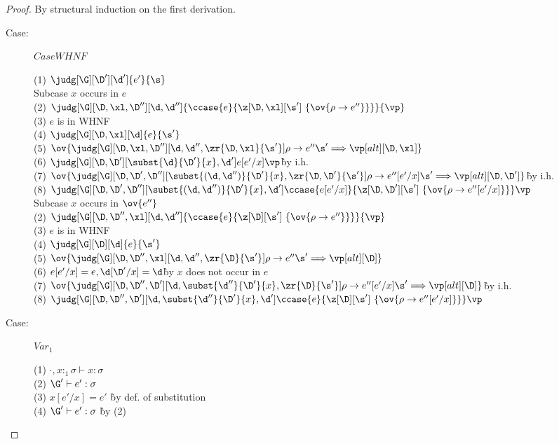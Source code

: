 \begin{proof}
By structural induction on the first derivation.

\begin{description}

\item[Case:] $CaseWHNF$
\begin{tabbing}
  (1) $\judg[\G][\D'][\d']{e'}{\s}$\\
  Subcase $x$ occurs in $e$\\
  (2) $\judg[\G][\D,\xl,\D''][\d,\d'']{\ccase{e}{\z[\D,\xl][\s']~\{\ov{\rho\to e''}\}}}{\vp}$\\
  (3) $e$ is in WHNF\\
  (4) $\judg[\G][\D,\xl][\d]{e}{\s'}$\\
  (5) $\ov{\judg[\G][\D,\xl,\D''][\d,\d'',\zr{\D,\xl}{\s'}]{\rho\to e''}{\s' \Longrightarrow \vp}[alt][\D,\xl]}$\\
  (6) $\judg[\G][\D,\D'][\subst{\d}{\D'}{x}, \d']{e[e'/x]}{\vp}$\`by i.h.\\
  (7) $\ov{\judg[\G][\D,\D',\D''][\subst{(\d,\d'')}{\D'}{x},\zr{\D,\D'}{\s'}]{\rho\to e''[e'/x]}{\s' \Longrightarrow \vp}[alt][\D,\D']}$\` by i.h.\\
  (8) $\judg[\G][\D,\D',\D''][\subst{(\d,\d'')}{\D'}{x},\d']{\ccase{e[e'/x]}{\z[\D,\D'][\s']~\{\ov{\rho\to e''[e'/x]}\}}}{\vp}$\\
  Subcase $x$ occurs in $\ov{e''}$\\
  (2) $\judg[\G][\D,\D'',\xl][\d,\d'']{\ccase{e}{\z[\D][\s']~\{\ov{\rho\to e''}\}}}{\vp}$\\
  (3) $e$ is in WHNF\\
  (4) $\judg[\G][\D][\d]{e}{\s'}$\\
  (5) $\ov{\judg[\G][\D,\D'',\xl][\d,\d'',\zr{\D}{\s'}]{\rho\to e''}{\s' \Longrightarrow \vp}[alt][\D]}$\\
  (6) $e[e'/x] = e, \d[\D'/x]=\d$\` by $x$ does not occur in $e$\\
  (7) $\ov{\judg[\G][\D,\D'',\D'][\d,\subst{\d''}{\D'}{x},\zr{\D}{\s'}]{\rho\to e''[e'/x]}{\s' \Longrightarrow \vp}[alt][\D]}$\`by i.h.\\
  (8) $\judg[\G][\D,\D'',\D'][\d,\subst{\d''}{\D'}{x},\d']{\ccase{e}{\z[\D][\s']~\{\ov{\rho\to e''[e'/x]}\}}}{\vp}$\\
\end{tabbing}


\item[Case:] $Var_1$
\begin{tabbing}
  (1) $\cdot,x{:}_1\sigma \vdash x : \sigma$\\
  (2) $\G' \vdash e' : \sigma$\\
  (3) $x[e'/x] = e'$ \` by def. of substitution\\
  (4) $\G' \vdash e' : \sigma$ \` by (2)\\
\end{tabbing}


\end{description}
\end{proof}
